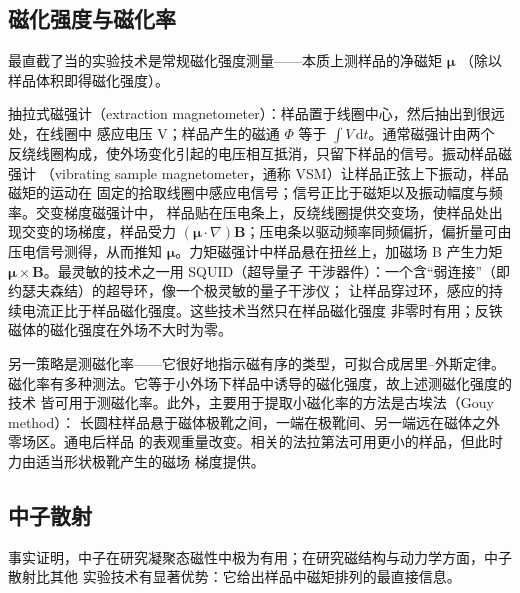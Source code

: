 \subsection{磁化强度与磁化率}

最直截了当的实验技术是常规磁化强度测量——本质上测样品的净磁矩 $\boldsymbol{\mu}$
（除以样品体积即得磁化强度）。

抽拉式磁强计（extraction magnetometer）：样品置于线圈中心，然后抽出到很远处，在线圈中
感应电压 V；样品产生的磁通 $\Phi$ 等于 $\int V\,\mathrm{d}t$。通常磁强计由两个
反绕线圈构成，使外场变化引起的电压相互抵消，只留下样品的信号。振动样品磁强计
（vibrating sample magnetometer，通称 VSM）让样品正弦上下振动，样品磁矩的运动在
固定的拾取线圈中感应电信号；信号正比于磁矩以及振动幅度与频率。交变梯度磁强计中，
样品贴在压电条上，反绕线圈提供交变场，使样品处出现交变的场梯度，样品受力
$(\boldsymbol{\mu}\cdot\nabla)\mathbf{B}$；压电条以驱动频率同频偏折，偏折量可由
压电信号测得，从而推知 $\boldsymbol{\mu}$。力矩磁强计中样品悬在扭丝上，加磁场 B
产生力矩 $\boldsymbol{\mu}\times\mathbf{B}$。最灵敏的技术之一用 SQUID（超导量子
干涉器件）：一个含“弱连接”（即约瑟夫森结）的超导环，像一个极灵敏的量子干涉仪；
让样品穿过环，感应的持续电流正比于样品磁化强度。这些技术当然只在样品磁化强度
非零时有用；反铁磁体的磁化强度在外场不大时为零。

另一策略是测磁化率——它很好地指示磁有序的类型，可拟合成居里--外斯定律。
磁化率有多种测法。它等于小外场下样品中诱导的磁化强度，故上述测磁化强度的技术
皆可用于测磁化率。此外，主要用于提取小磁化率的方法是古埃法（Gouy method）：
长圆柱样品悬于磁体极靴之间，一端在极靴间、另一端远在磁体之外零场区。通电后样品
的表观重量改变。相关的法拉第法可用更小的样品，但此时力由适当形状极靴产生的磁场
梯度提供。

\subsection{中子散射}

事实证明，中子在研究凝聚态磁性中极为有用；在研究磁结构与动力学方面，中子散射比其他
实验技术有显著优势：它给出样品中磁矩排列的最直接信息。


